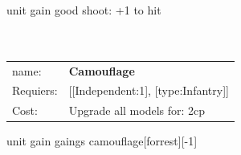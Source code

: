 unit gain good shoot: +1 to hit\\ 









\ \\
\ \\
\begin{tabular}{ll}
name: & {\bf Camouflage } \\
Requiers: & [[Independent:1], [type:Infantry]] \\
Cost: & Upgrade all models for: 2cp \\
\end{tabular}

unit gain gaings camouflage[forrest][-1]\\ 









\ \\
